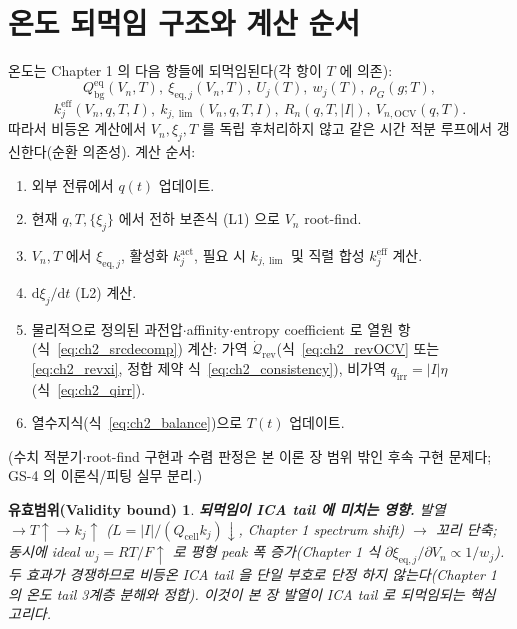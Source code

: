 \documentclass[11pt,a4paper]{article}
\newtheorem*{boundbox}{유효범위(Validity bound)}
\newcommand{\dd}{\mathrm{d}}
\newcommand{\eff}{\mathrm{eff}}
\newcommand{\eq}{\mathrm{eq}}
\newcommand{\bg}{\mathrm{bg}}
\newcommand{\cell}{\mathrm{cell}}
\newcommand{\OCV}{\mathrm{OCV}}
\newcommand{\irr}{\mathrm{irr}}
\newcommand{\rev}{\mathrm{rev}}
\begin{document}
\section{온도 되먹임 구조와 계산 순서}\label{sec:ch2_feedback}
온도는 Chapter 1 의 다음 항들에 되먹임된다(각 항이 $T$ 에 의존):
\begin{equation}
Q_\bg^{\eq}(V_n,T),\ \xi_{\eq,j}(V_n,T),\ U_j(T),\ w_j(T),\ \rho_G(g;T),
\label{eq:ch2_feedT1}
\end{equation}
\begin{equation}
k_j^{\eff}(V_n,q,T,I),\ k_{j,\lim}(V_n,q,T,I),\ R_n(q,T,|I|),\ V_{n,\OCV}(q,T).
\label{eq:ch2_feedT2}
\end{equation}
따라서 비등온 계산에서 $V_n,\xi_j,T$ 를 독립 후처리하지 않고 같은 시간 적분 루프에서 갱신한다(순환 의존성). 계산 순서:
\begin{enumerate}[label=\arabic*),leftmargin=2.0em]
\item 외부 전류에서 $q(t)$ 업데이트.
\item 현재 $q,T,\{\xi_j\}$ 에서 전하 보존식 (L1) 으로 $V_n$ root-find.
\item $V_n,T$ 에서 $\xi_{\eq,j}$, 활성화 $k_j^{\mathrm{act}}$, 필요 시 $k_{j,\lim}$ 및 직렬 합성 $k_j^{\eff}$ 계산.
\item $\dd\xi_j/\dd t$ (L2) 계산.
\item 물리적으로 정의된 과전압$\cdot$affinity$\cdot$entropy coefficient 로 열원 항(식~\eqref{eq:ch2_srcdecomp}) 계산:
  가역 $\dot{\mathcal Q}_{\rev}$(식~\eqref{eq:ch2_revOCV} 또는 \eqref{eq:ch2_revxi}, 정합 제약 식~\eqref{eq:ch2_consistency}),
  비가역 $q_\irr=|I|\eta$(식~\eqref{eq:ch2_qirr}).
\item 열수지식(식~\eqref{eq:ch2_balance})으로 $T(t)$ 업데이트.
\end{enumerate}
(수치 적분기$\cdot$root-find 구현과 수렴 판정은 본 이론 장 범위 밖인 후속 구현 문제다; GS-4 의
이론식/피팅 실무 분리.)
\begin{boundbox}
\textbf{되먹임이 ICA tail 에 미치는 영향.} 발열 $\to T\uparrow\to k_j\uparrow$ ($L=|I|/(Q_\cell k_j)\downarrow$,
Chapter 1 spectrum shift) $\to$ 꼬리 단축; 동시에 ideal $w_j=RT/F\uparrow$ 로 평형 peak 폭 증가(Chapter 1
식 $\partial\xi_{\eq,j}/\partial V_n\propto1/w_j$). 두 효과가 경쟁하므로 비등온 ICA tail 을 단일 부호로 단정
하지 않는다(Chapter 1 의 온도 tail 3계층 분해와 정합). 이것이 본 장 발열이 ICA tail 로 되먹임되는 핵심 고리다.
\end{boundbox}
\end{document}

